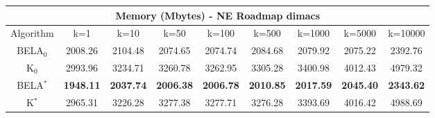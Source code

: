 \begin{tabular}{c|cccccccc}\toprule
\multicolumn{9}{c}{Memory (Mbytes) - NE Roadmap dimacs}\\ \midrule
Algorithm & k=1 & k=10 & k=50 & k=100 & k=500 & k=1000 & k=5000 & k=10000 \\ \midrule
BELA$_0$ & 2008.26 & 2104.48 & 2074.65 & 2074.74 & 2084.68 & 2079.92 & 2075.22 & 2392.76 \\
K$_0$ & 2993.96 & 3234.71 & 3260.78 & 3262.95 & 3305.28 & 3400.98 & 4012.43 & 4979.32 \\
BELA$^*$ & \textbf{1948.11} & \textbf{2037.74} & \textbf{2006.38} & \textbf{2006.78} & \textbf{2010.85} & \textbf{2017.59} & \textbf{2045.40} & \textbf{2343.62} \\
K$^*$ & 2965.31 & 3226.28 & 3277.38 & 3277.71 & 3276.28 & 3393.69 & 4016.42 & 4988.69 \\ \bottomrule 
\end{tabular}
